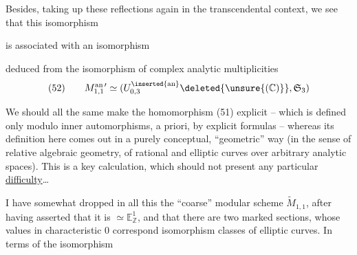 

Besides, taking up these reflections again in the
transcendental context, we see that
this isomorphism


is associated with an isomorphism


deduced from the isomorphism of complex analytic
multiplicities
\[
(52)\qquad M_{1,1}^{\mathrm{an}\,\prime}\simeq
(U_{0,3}^{\inserted{\mathrm{an}}}\deleted{\unsure{(\mathbb C)}},\mathfrak S_3)
\]

We should all the same make
the homomorphism (51) explicit -- which is defined only
modulo inner automorphisms, a priori,
by explicit formulas -- whereas
its definition here comes out in a purely conceptual, ``geometric'' way (in the sense
of relative algebraic geometry, of
rational and elliptic curves over
arbitrary analytic spaces). This is
a key calculation,  which should not
present any particular \uline{difficulty}\ldots

I have somewhat dropped  in all
this the ``coarse'' modular scheme $\widetilde M_{1,1}$,
after having asserted that it is $\simeq\mathbb E_{\mathbb Z}^{1}$, and
that there are two marked sections,
whose  values in characteristic $0$ correspond
  isomorphism classes of
 elliptic curves. In terms of the isomorphism